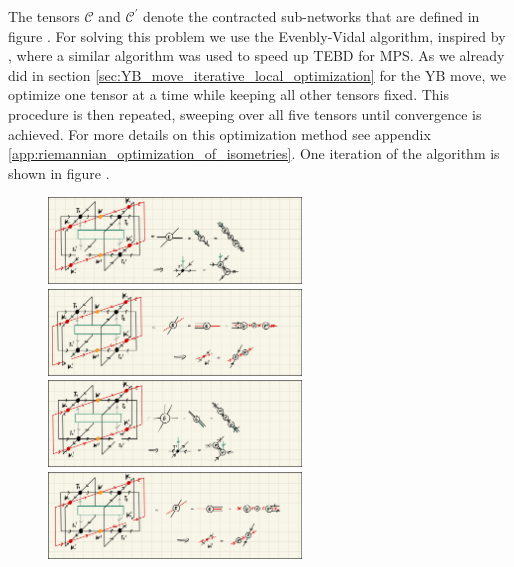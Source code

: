 The tensors $\mathcal{C}$ and $\mathcal{C}^\prime$ denote the contracted sub-networks that are defined in figure . For solving this problem we use the Evenbly-Vidal algorithm, inspired by \cite{cite:fast_time_evolution_of_mps_using_qr}, where a similar algorithm was used to speed up TEBD for MPS. As we already did in section \ref{sec:YB_move_iterative_local_optimization} for the YB move, we optimize one tensor at a time while keeping all other tensors fixed. This procedure is then repeated, sweeping over all five tensors until convergence is achieved. For more details on this optimization method see appendix \ref{app:riemannian_optimization_of_isometries}. One iteration of the algorithm is shown in figure .
\begin{figure}
	\centering
	\subcaptionbox{\label{fig:disoTPS_TEBD_local_update_T1}}
	{%
		\includegraphics[width=0.6\textwidth]{figures/disoTPS/disoTPS_TEBD_local_update_T1.jpeg}
	}
	\subcaptionbox{\label{fig:disoTPS_TEBD_local_update_W1}}
	{%
		\includegraphics[width=0.6\textwidth]{figures/disoTPS/disoTPS_TEBD_local_update_Wm.jpeg}
	}
	\subcaptionbox{\label{fig:disoTPS_TEBD_local_update_T2}}
	{%
		\includegraphics[width=0.6\textwidth]{figures/disoTPS/disoTPS_TEBD_local_update_T2.jpeg}
	}
	\subcaptionbox{\label{fig:disoTPS_TEBD_local_update_W3}}
	{%
		\includegraphics[width=0.6\textwidth]{figures/disoTPS/disoTPS_TEBD_local_update_Wp.jpeg}
}
\end{figure}
